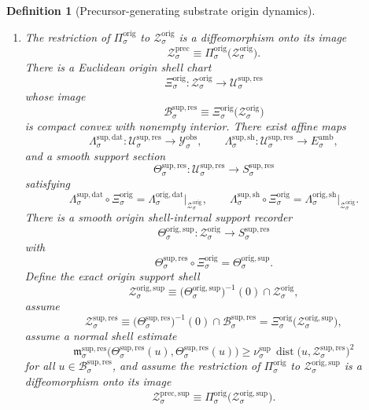 \documentclass[11pt]{article}
\newcommand{\DataSpace}[1]{\mathcal Y_{#1}^{\mathrm{obs}}}
\newcommand{\AmbientTarget}[1]{E_{#1}^{\mathrm{amb}}}
\newcommand{\ResSpace}[1]{\mathcal U_{#1}^{\mathrm{sup,res}}}
\newcommand{\ResBody}[1]{\mathcal B_{#1}^{\mathrm{sup,res}}}
\newcommand{\ResTarget}[1]{S_{#1}^{\mathrm{sup,res}}}
\newcommand{\ResPair}[1]{\mathfrak m_{#1}^{\mathrm{sup,res}}}
\newcommand{\ResSection}[1]{\Theta_{#1}^{\mathrm{sup,res}}}
\newcommand{\ResData}[1]{\Lambda_{#1}^{\mathrm{sup,dat}}}
\newcommand{\ResShellMap}[1]{\Lambda_{#1}^{\mathrm{sup,sh}}}
\newcommand{\ResShellSet}[1]{\mathcal Z_{#1}^{\mathrm{sup,res}}}
\newcommand{\PrecShellSet}[1]{\mathcal Z_{#1}^{\mathrm{prec}}}
\newcommand{\PrecSupportShell}[1]{\mathcal Z_{#1}^{\mathrm{prec,sup}}}
\newcommand{\OrigProj}[1]{\Pi_{#1}^{\mathrm{orig}}}
\newcommand{\OrigData}[1]{\Lambda_{#1}^{\mathrm{orig,dat}}}
\newcommand{\OrigShellMap}[1]{\Lambda_{#1}^{\mathrm{orig,sh}}}
\newcommand{\OrigShellSet}[1]{\mathcal Z_{#1}^{\mathrm{orig}}}
\newcommand{\OrigChart}[1]{\Xi_{#1}^{\mathrm{orig}}}
\newcommand{\OrigSupport}[1]{\Theta_{#1}^{\mathrm{orig,sup}}}
\newcommand{\OrigSupportShell}[1]{\mathcal Z_{#1}^{\mathrm{orig,sup}}}
\newtheorem{definition}{Definition}
\begin{document}
\begin{definition}[Precursor-generating substrate origin dynamics]
\begin{enumerate}
    \item The restriction of \(\OrigProj{\sigma}\) to \(\OrigShellSet{\sigma}\) is a diffeomorphism onto its image
    \[
    \PrecShellSet{\sigma}
    \equiv
    \OrigProj{\sigma}\bigl(\OrigShellSet{\sigma}\bigr).
    \]
    There is a Euclidean origin shell chart
    \[
    \OrigChart{\sigma}:\OrigShellSet{\sigma}\to\ResSpace{\sigma}
    \]
    whose image
    \[
    \ResBody{\sigma}
    \equiv
    \OrigChart{\sigma}\bigl(\OrigShellSet{\sigma}\bigr)
    \]
    is compact convex with nonempty interior. There exist affine maps
    \[
    \ResData{\sigma}:\ResSpace{\sigma}\to\DataSpace{\sigma},
    \qquad
    \ResShellMap{\sigma}:\ResSpace{\sigma}\to\AmbientTarget{\sigma},
    \]
    and a smooth support section
    \[
    \ResSection{\sigma}:\ResSpace{\sigma}\to\ResTarget{\sigma}
    \]
    satisfying
    \begin{equation}
    \ResData{\sigma}\circ\OrigChart{\sigma}
    =
    \OrigData{\sigma}\big|_{\OrigShellSet{\sigma}},
    \qquad
    \ResShellMap{\sigma}\circ\OrigChart{\sigma}
    =
    \OrigShellMap{\sigma}\big|_{\OrigShellSet{\sigma}}.
    \label{eq:origchartreadouts}
    \end{equation}
    There is a smooth origin shell-internal support recorder
    \[
    \OrigSupport{\sigma}:\OrigShellSet{\sigma}\to\ResTarget{\sigma}
    \]
    with
    \begin{equation}
    \ResSection{\sigma}\circ\OrigChart{\sigma}
    =
    \OrigSupport{\sigma}.
    \label{eq:origsupporttransport}
    \end{equation}
    Define the exact origin support shell
    \begin{equation}
    \OrigSupportShell{\sigma}
    \equiv
    \bigl(\OrigSupport{\sigma}\bigr)^{-1}(0)\cap\OrigShellSet{\sigma},
    \label{eq:origsupportshell}
    \end{equation}
    assume
    \begin{equation}
    \ResShellSet{\sigma}
    \equiv
    \bigl(\ResSection{\sigma}\bigr)^{-1}(0)\cap\ResBody{\sigma}
    =
    \OrigChart{\sigma}\bigl(\OrigSupportShell{\sigma}\bigr),
    \label{eq:origtransportedsupportshell}
    \end{equation}
    assume a normal shell estimate
    \begin{equation}
    \ResPair{\sigma}\bigl(\ResSection{\sigma}(u),\ResSection{\sigma}(u)\bigr)
    \ge
    \nu_{\sigma}^{\mathrm{sup}}\,
    \operatorname{dist}\bigl(u,\ResShellSet{\sigma}\bigr)^{2}
    \label{eq:orignormal}
    \end{equation}
    for all \(u\in\ResBody{\sigma}\), and assume the restriction of \(\OrigProj{\sigma}\) to \(\OrigSupportShell{\sigma}\) is a diffeomorphism onto its image
    \[
    \PrecSupportShell{\sigma}
    \equiv
    \OrigProj{\sigma}\bigl(\OrigSupportShell{\sigma}\bigr).
    \]


\end{enumerate}
\end{definition}
\end{document}
